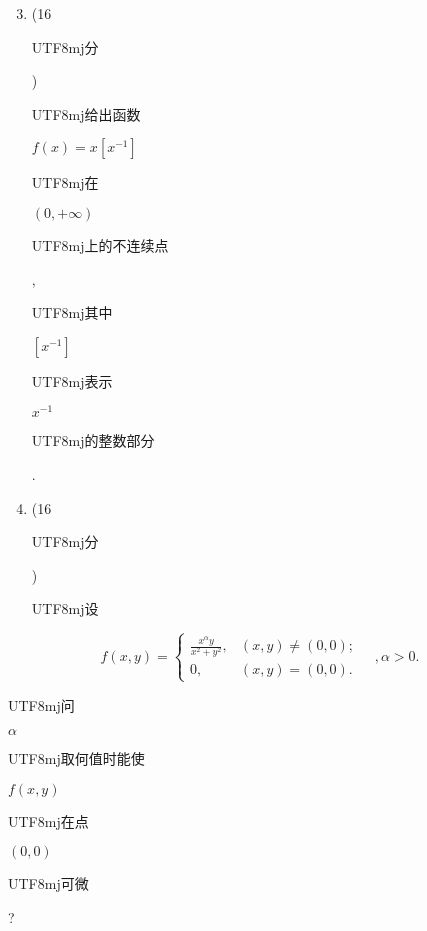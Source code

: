 \documentclass[10pt]{article}
\begin{document}
\begin{enumerate}
  \setcounter{enumi}{2}
  \item (16 \begin{CJK}{UTF8}{mj}分\end{CJK}) \begin{CJK}{UTF8}{mj}给出函数\end{CJK} $f(x)=x\left[x^{-1}\right]$ \begin{CJK}{UTF8}{mj}在\end{CJK} $(0,+\infty)$ \begin{CJK}{UTF8}{mj}上的不连续点\end{CJK}, \begin{CJK}{UTF8}{mj}其中\end{CJK} $\left[x^{-1}\right]$ \begin{CJK}{UTF8}{mj}表示\end{CJK} $x^{-1}$ \begin{CJK}{UTF8}{mj}的整数部分\end{CJK}.

  \item (16 \begin{CJK}{UTF8}{mj}分\end{CJK}) \begin{CJK}{UTF8}{mj}设\end{CJK}

\end{enumerate}
$$
f(x, y)=\left\{\begin{array}{ll}
\frac{x^{\alpha} y}{x^{2}+y^{2}}, & (x, y) \neq(0,0) ; \\
0, & (x, y)=(0,0) .
\end{array} \quad, \alpha>0 .\right.
$$
\begin{CJK}{UTF8}{mj}问\end{CJK} $\alpha$ \begin{CJK}{UTF8}{mj}取何值时能使\end{CJK} $f(x, y)$ \begin{CJK}{UTF8}{mj}在点\end{CJK} $(0,0)$ \begin{CJK}{UTF8}{mj}可微\end{CJK}?
\end{document}
